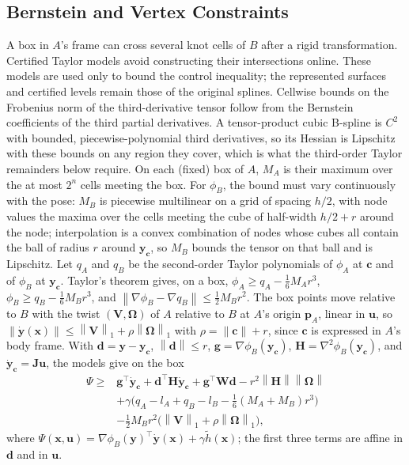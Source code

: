 \documentclass[journal]{IEEEtran}
\theoremstyle{definition}
\newcommand{\norm}[1]{\left\lVert #1\right\rVert}
\begin{document}
\subsection{Bernstein and Vertex Constraints}
A box in $A$'s frame can cross several knot cells of $B$ after a rigid transformation.
Certified Taylor models avoid constructing their intersections online. These models are used
only to bound the control inequality; the represented surfaces and certified levels remain
those of the original splines.
Cellwise bounds on the Frobenius norm of the third-derivative tensor follow from the Bernstein
coefficients of the third partial derivatives. A tensor-product cubic B-spline is $C^2$ with bounded,
piecewise-polynomial third
derivatives, so its Hessian is Lipschitz with these bounds on any region they cover, which is what the
third-order Taylor remainders below require. On each (fixed) box of $A$, $M_A$ is their maximum over
the at most $2^n$ cells meeting the box. For $\phi_B$, the bound must vary continuously with the pose:
$M_B$ is piecewise multilinear on a grid of spacing $h/2$, with node values the maxima over the cells meeting
the cube of half-width $h/2+r$ around the node; interpolation is a convex combination of nodes whose
cubes all contain the ball of radius $r$ around $\mathbf y_{\mathbf c}$, so $M_B$ bounds the tensor on
that ball and is Lipschitz. Let $q_A$ and $q_B$ be the second-order Taylor polynomials of
$\phi_A$ at $\mathbf c$ and of $\phi_B$ at $\mathbf y_{\mathbf c}$. Taylor's theorem gives, on a box,
$\phi_A\ge q_A-\tfrac16M_Ar^3$, $\phi_B\ge q_B-\tfrac16M_Br^3$, and
$\norm{\nabla\phi_B-\nabla q_B}\le\tfrac12M_Br^2$. The box points move relative to $B$ with the twist
$(\mathbf V,\boldsymbol\Omega)$ of $A$ relative to $B$ at $A$'s origin $\mathbf p_A$, linear in $\mathbf u$,
so $\norm{\dot{\mathbf y}(\mathbf x)}\le\norm{\mathbf V}_1+\rho\norm{\boldsymbol\Omega}_1$ with
$\rho=\norm{\mathbf c}+r$, since $\mathbf c$ is expressed in $A$'s body frame.
With $\mathbf d=\mathbf y-\mathbf y_{\mathbf c}$, $\norm{\mathbf d}\le r$,
$\mathbf g=\nabla\phi_B(\mathbf y_{\mathbf c})$, $\mathbf H=\nabla^2\phi_B(\mathbf y_{\mathbf c})$, and
$\dot{\mathbf y}_{\mathbf c}=\mathbf J\mathbf u$, the models give on the box
\begin{equation}\label{eq:psi-lb}
\begin{aligned}
\Psi\ge{}&\mathbf g^\top\dot{\mathbf y}_{\mathbf c}+\mathbf d^\top\mathbf H\dot{\mathbf y}_{\mathbf c}
+\mathbf g^\top\mathbf W\mathbf d-r^2\norm{\mathbf H}\norm{\boldsymbol\Omega}\\
&+\gamma\big(q_A-l_A+q_B-l_B-\tfrac16(M_A+M_B)r^3\big)\\
&-\tfrac12M_Br^2\big(\norm{\mathbf V}_1+\rho\norm{\boldsymbol\Omega}_1\big),
\end{aligned}
\end{equation}
where $\Psi(\mathbf x,\mathbf u)=\nabla\phi_B(\mathbf y)^\top\dot{\mathbf y}(\mathbf x)+\gamma\tilde h(\mathbf x)$;
the first three terms are affine in $\mathbf d$ and in $\mathbf u$.
\end{document}

